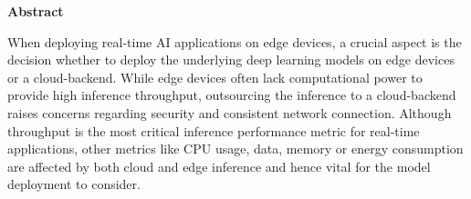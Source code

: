 \vspace*{2cm}

\begin{center}
    \textbf{Abstract}
\end{center}

\vspace*{1cm}

\begin{comment}
\noindent When deploying real-time AI applications, a crucial aspect is the decision whether to deploy the underlying deep learning models on edge devices or on a cloud-backend.
For the model inference various things need to be considered, amongst other things preprocessing, computational demands,
specialised hardware (GPU, TPU, neuromorphic co-processors, FPGA),
network latencies and energy consumption. Most of these aspects depend on both the model as well as the environment where the model is deployed. 
In order to help with the optimal selection of cloud and edge inference to achieve real-time AI, this thesis proposes a performance model characterising the deployment of a deep learning model and the resulting trade-offs.
Based on this performance model, the most essential trade-offs of the different deployment options get demonstrated by conducting multiple experiments using image classification as a use case. After the evaluation of these experiments, recommendations for the deployment are proposed.



-----------------------------------------------------------------------------
\end{comment}




\noindent When deploying real-time AI applications on edge devices, a crucial aspect is the decision whether to deploy the underlying deep learning models on edge devices or a cloud-backend.
While edge devices often lack computational power to provide high inference throughput, outsourcing the inference to a cloud-backend raises concerns regarding security and consistent network connection.
Although throughput is the most critical inference performance metric for real-time applications, other metrics like CPU usage, data, memory or energy consumption are affected by both cloud and edge inference and hence vital for the model deployment to consider.

